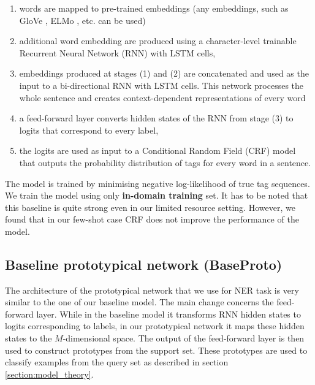 \begin{enumerate}
	\item words are mapped to pre-trained embeddings (any embeddings, such as GloVe \cite{}, ELMo \cite{}, etc. can be used)
    \item additional word embedding are produced using a character-level trainable Recurrent Neural Network (RNN) with LSTM cells,
    \item embeddings produced at stages (1) and (2) are concatenated and used as the input to a bi-directional RNN with LSTM cells. This network processes the whole sentence and creates context-dependent representations of every word
    \item a feed-forward layer converts hidden states of the RNN from stage (3) to logits that correspond to every label,
    \item the logits are used as input to a Conditional Random Field (CRF) \cite{} model that outputs the probability distribution of tags for every word in a sentence.
\end{enumerate}

The model is trained by minimising negative log-likelihood of true tag sequences. We train the model using  only \textbf{in-domain training} set. It has to be noted that this baseline is quite strong even in our limited resource setting. However, we found that in our few-shot case CRF does not improve the performance of the model. %



\subsection{Baseline prototypical network (BaseProto)}

The architecture of the prototypical network that we use for NER task is very similar to the one of our baseline model. The main change concerns the feed-forward layer. While in the baseline model it transforms RNN hidden states to logits corresponding to labels, in our prototypical network it maps these hidden states to the $M$-dimensional space. The output of the feed-forward layer is then used to construct prototypes from the support set. These prototypes are used to classify examples from the query set as described in section \ref{section:model_theory}.

